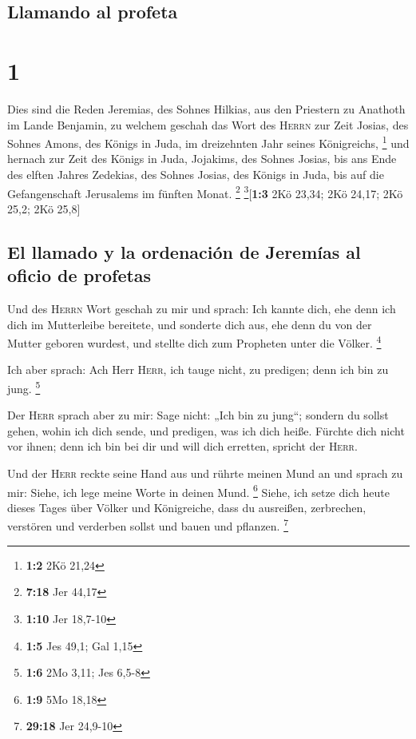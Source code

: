 \hypertarget{llamando-al-profeta}{%
\subsection{Llamando al profeta}\label{llamando-al-profeta}}

\hypertarget{section}{%
\section{1}\label{section}}

 Dies sind die Reden Jeremias, des Sohnes Hilkias, aus den
Priestern zu Anathoth im Lande Benjamin,  zu welchem
geschah das Wort des \textsc{Herrn} zur Zeit Josias, des Sohnes Amons,
des Königs in Juda, im dreizehnten Jahr seines Königreichs, \footnote{\textbf{1:2}
  2Kö 21,24}  und hernach zur Zeit des Königs in Juda,
Jojakims, des Sohnes Josias, bis ans Ende des elften Jahres Zedekias,
des Sohnes Josias, des Königs in Juda, bis auf die Gefangenschaft
Jerusalems im fünften Monat. \footnote{\textbf{7:18} Jer 44,17}
\footnote{\textbf{1:10} Jer 18,7-10}{[}\textbf{1:3} 2Kö 23,34; 2Kö
24,17; 2Kö 25,2; 2Kö 25,8{]}

\hypertarget{el-llamado-y-la-ordenaciuxf3n-de-jeremuxedas-al-oficio-de-profetas}{%
\subsection{El llamado y la ordenación de Jeremías al oficio de
profetas}\label{el-llamado-y-la-ordenaciuxf3n-de-jeremuxedas-al-oficio-de-profetas}}

 Und des \textsc{Herrn} Wort geschah zu mir und sprach:
 Ich kannte dich, ehe denn ich dich im Mutterleibe
bereitete, und sonderte dich aus, ehe denn du von der Mutter geboren
wurdest, und stellte dich zum Propheten unter die Völker. \footnote{\textbf{1:5}
  Jes 49,1; Gal 1,15}

 Ich aber sprach: Ach Herr \textsc{Herr}, ich tauge nicht,
zu predigen; denn ich bin zu jung. \footnote{\textbf{1:6} 2Mo 3,11; Jes
  6,5-8}

 Der \textsc{Herr} sprach aber zu mir: Sage nicht: „Ich
bin zu jung``; sondern du sollst gehen, wohin ich dich sende, und
predigen, was ich dich heiße.  Fürchte dich nicht vor
ihnen; denn ich bin bei dir und will dich erretten, spricht der
\textsc{Herr}.

 Und der \textsc{Herr} reckte seine Hand aus und rührte
meinen Mund an und sprach zu mir: Siehe, ich lege meine Worte in deinen
Mund. \footnote{\textbf{1:9} 5Mo 18,18}  Siehe, ich setze
dich heute dieses Tages über Völker und Königreiche, dass du ausreißen,
zerbrechen, verstören und verderben sollst und bauen und pflanzen.
\footnote{\textbf{29:18} Jer 24,9-10}

